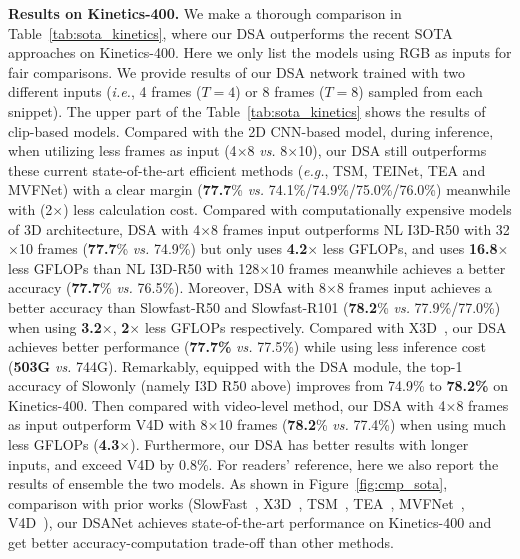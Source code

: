 \documentclass[sigconf]{acmart}
\def\x{$\times$}
\begin{document}
\textbf{Results on Kinetics-400.}
We make a thorough comparison in Table~\ref{tab:sota_kinetics}, where our DSA outperforms the recent SOTA approaches on Kinetics-400. Here we only list the models using RGB as inputs for fair comparisons. We provide results of our DSA network trained with two different inputs (\emph{i.e.}, 4 frames ($T=4$) or 8 frames ($T=8$) sampled from each snippet).
The upper part of the Table~\ref{tab:sota_kinetics} shows the results of clip-based models. Compared with the 2D CNN-based model, during inference, when utilizing less frames as input (4\x8 \emph{vs.} 8\x10), our DSA still outperforms these current state-of-the-art efficient methods (\emph{e.g.}, TSM, TEINet, TEA and MVFNet) with a clear margin (\textbf{77.7}\% \emph{vs.} 74.1\%/74.9\%/75.0\%/76.0\%) meanwhile with (2\x) less calculation cost. 
Compared with computationally expensive models of 3D architecture, DSA with 4$\times$8 frames input outperforms NL I3D-R50 with 32$\times$10 frames (\textbf{77.7}\% \emph{vs.} 74.9\%) but only uses \textbf{4.2\x} less GFLOPs, and uses \textbf{16.8\x} less GFLOPs than NL I3D-R50 with 128$\times$10 frames meanwhile achieves a better accuracy (\textbf{77.7}\% \emph{vs.} 76.5\%). 
Moreover, DSA with 8$\times$8 frames input achieves a better accuracy than Slowfast-R50 and Slowfast-R101 (\textbf{78.2}\% \emph{vs.} 77.9\%/77.0\%) when using \textbf{3.2\x}, \textbf{2\x} less GFLOPs respectively.
Compared with X3D~\cite{feichtenhofer2020x3d}, our DSA achieves better performance (\textbf{77.7\%} \emph{vs.} 77.5\%) while using less inference cost (\textbf{503G} \emph{vs.} 744G).
Remarkably, equipped with the DSA module, the top-1 accuracy of Slowonly (namely I3D R50 above) improves from 74.9\% to \textbf{78.2\%} on Kinetics-400.
Then compared with video-level method, our DSA with 4\x8 frames as input outperform V4D with 8\x10 frames (\textbf{78.2}\% \emph{vs.} 77.4\%) when using much less GFLOPs (\textbf{4.3\x}). 
Furthermore, our DSA has better results with longer inputs, and exceed V4D by 0.8\%. 
For readers’ reference, here we also report the results of ensemble the two models.
As shown in Figure~\ref{fig:cmp_sota}, comparison with prior works (SlowFast~\cite{slowfast}, X3D~\cite{feichtenhofer2020x3d}, TSM~\cite{tsm}, TEA~\cite{li2020tea}, MVFNet~\cite{wu2020MVFNet}, V4D~\cite{zhang2020v4d}), our DSANet achieves state-of-the-art performance on Kinetics-400 and get better accuracy-computation trade-off than other methods.
\end{document}
